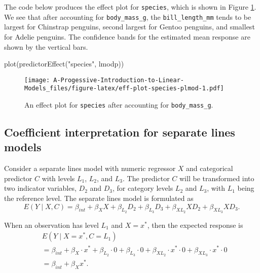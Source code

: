 \documentclass[
]{book}
\newenvironment{Shaded}{\begin{snugshade}}{\end{snugshade}}
\newcommand{\FunctionTok}[1]{\textcolor[rgb]{0.00,0.00,0.00}{#1}}
\newcommand{\NormalTok}[1]{#1}
\newcommand{\StringTok}[1]{\textcolor[rgb]{0.31,0.60,0.02}{#1}}
\theoremstyle{definition}
\theoremstyle{definition}
\theoremstyle{definition}
\theoremstyle{definition}
\theoremstyle{remark}
\begin{document}
The code below produces the effect plot for \texttt{species}, which is shown in
Figure \ref{fig:eff-plot-species-plmod}. We see that after accounting
for \texttt{body\_mass\_g}, the \texttt{bill\_length\_mm} tends to be largest for
Chinstrap penguins, second largest for Gentoo penguins, and smallest for
Adelie penguins. The confidence bands for the estimated mean response
are shown by the vertical bars.

\begin{Shaded}
\begin{Highlighting}[]
\FunctionTok{plot}\NormalTok{(}\FunctionTok{predictorEffect}\NormalTok{(}\StringTok{"species"}\NormalTok{, lmodp))}
\end{Highlighting}
\end{Shaded}

\begin{figure}
\centering
\texttt{[image: A-Progessive-Introduction-to-Linear-Models\_files/figure-latex/eff-plot-species-plmod-1.pdf]}
\caption{\label{fig:eff-plot-species-plmod}An effect plot for \texttt{species} after accounting for \texttt{body\_mass\_g}.}
\end{figure}

\hypertarget{sl-interp}{%
\subsection{Coefficient interpretation for separate lines models}\label{sl-interp}}

Consider a separate lines model with numeric regressor \(X\) and
categorical predictor \(C\) with levels \(L_1\), \(L_2\), and \(L_3\). The
predictor \(C\) will be transformed into two indicator variables, \(D_2\)
and \(D_3\), for category levels \(L_2\) and \(L_3\), with \(L_1\) being the
reference level. The separate lines model is formulated as \[
E(Y \mid X, C) = \beta_{int} + \beta_{X} X + \beta_{L_2} D_2 +  \beta_{L_3} D_3 + \beta_{XL_2} XD_2+\beta_{XL_3}XD_3. \label{eq:sl-def-interp}
\]

When an observation has level \(L_1\) and \(X=x^*\), then the expected
response is \[
\begin{aligned}
&E(Y\mid X = x^*, C=L_1) \\
&= \beta_{int} + \beta_X \cdot x^* + \beta_{L_2} \cdot 0 + \beta_{L_3} \cdot 0  + \beta_{X L_2} \cdot x^* \cdot 0 + \beta_{X L_3}\cdot x^* \cdot 0 \\
&= \beta_{int} + \beta_X x^*.
\end{aligned}
\label{eq:slr-mean-L1}
\]
\end{document}
